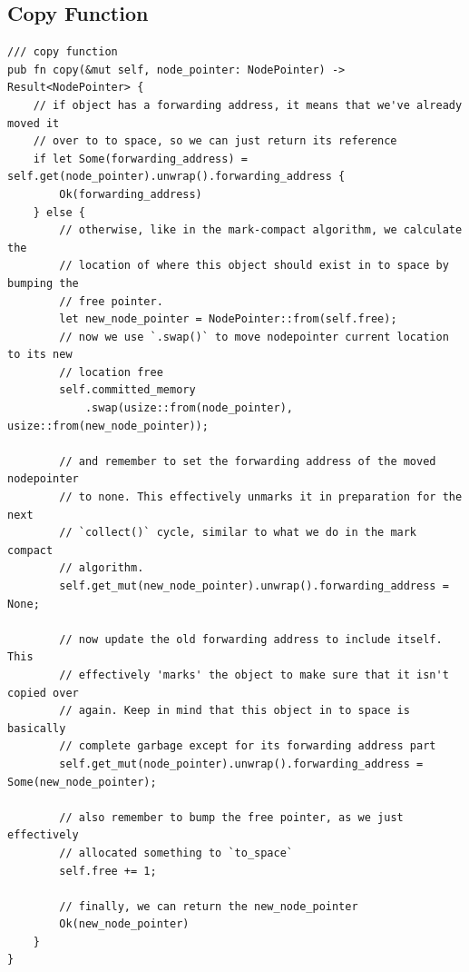 \documentclass[index]{subfiles}
\begin{document}
\subsection{Copy Function}
\begin{verbatim}
/// copy function
pub fn copy(&mut self, node_pointer: NodePointer) -> Result<NodePointer> {
    // if object has a forwarding address, it means that we've already moved it
    // over to to space, so we can just return its reference
    if let Some(forwarding_address) = self.get(node_pointer).unwrap().forwarding_address {
        Ok(forwarding_address)
    } else {
        // otherwise, like in the mark-compact algorithm, we calculate the
        // location of where this object should exist in to space by bumping the
        // free pointer.
        let new_node_pointer = NodePointer::from(self.free);
        // now we use `.swap()` to move nodepointer current location to its new
        // location free
        self.committed_memory
            .swap(usize::from(node_pointer), usize::from(new_node_pointer));

        // and remember to set the forwarding address of the moved nodepointer
        // to none. This effectively unmarks it in preparation for the next
        // `collect()` cycle, similar to what we do in the mark compact
        // algorithm.
        self.get_mut(new_node_pointer).unwrap().forwarding_address = None;

        // now update the old forwarding address to include itself. This
        // effectively 'marks' the object to make sure that it isn't copied over
        // again. Keep in mind that this object in to space is basically
        // complete garbage except for its forwarding address part
        self.get_mut(node_pointer).unwrap().forwarding_address = Some(new_node_pointer);

        // also remember to bump the free pointer, as we just effectively
        // allocated something to `to_space`
        self.free += 1;

        // finally, we can return the new_node_pointer
        Ok(new_node_pointer)
    }
}
\end{verbatim}
\end{document}
